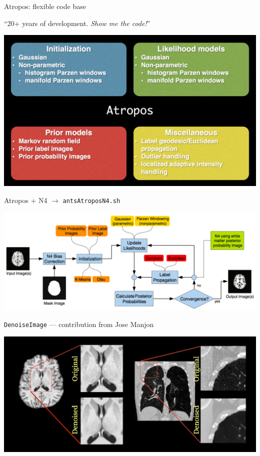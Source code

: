 \documentclass[ignorenonframetext,]{beamer}
\begin{document}
\begin{frame}{Atropos: flexible code base}

``20+ years of development. \emph{Show me the code!}''

\includegraphics{./tools/atropos/figures/atropos.png}

\end{frame}

\begin{frame}{Atropos + N4 \(\rightarrow\) \texttt{antsAtroposN4.sh}}

\includegraphics{./tools/atropos/figures/atroposFlow.png}

\end{frame}

\begin{frame}{\texttt{DenoiseImage} --- contribution from Jose Manjon}

\includegraphics{./tools/figures/denoising.png}

\end{frame}
\end{document}
